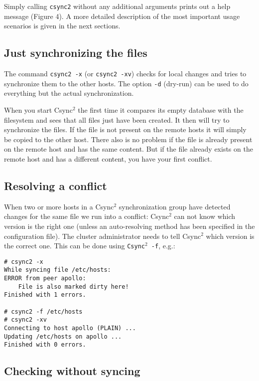 \documentclass[a4paper,twocolumn]{article}
\def\csync2{{\sc Csync$^{2}$}}
\begin{document}

Simply calling {\tt csync2} without any additional arguments prints out a
help message (Figure 4). A more detailed description of the most
important usage scenarios is given in the next sections.

\subsection{Just synchronizing the files}

The command {\tt csync2 -x} (or {\tt csync2 -xv}) checks for local changes and
tries to synchronize them to the other hosts. The option {\tt -d} (dry-run) can
be used to do everything but the actual synchronization.

When you start \csync2 the first time it compares its empty database with the
filesystem and sees that all files just have been created. It then will try
to synchronize the files. If the file is not present on the remote hosts it
will simply be copied to the other host. There also is no problem if the file
is already present on the remote host and has the same content. But if the
file already exists on the remote host and has a different content, you
have your first conflict.

\subsection{Resolving a conflict}

When two or more hosts in a \csync2 synchronization group have detected changes
for the same file we run into a conflict: \csync2 can not know which version is
the right one (unless an auto-resolving method has been specified in the
configuration file). The cluster administrator needs to tell \csync2 which
version is the correct one. This can be done using {\tt \csync2 -f}, e.g.:

\begin{verbatim}
# csync2 -x
While syncing file /etc/hosts:
ERROR from peer apollo:
    File is also marked dirty here!
Finished with 1 errors.

# csync2 -f /etc/hosts
# csync2 -xv
Connecting to host apollo (PLAIN) ...
Updating /etc/hosts on apollo ...
Finished with 0 errors.
\end{verbatim}

\subsection{Checking without syncing}
\end{document}
